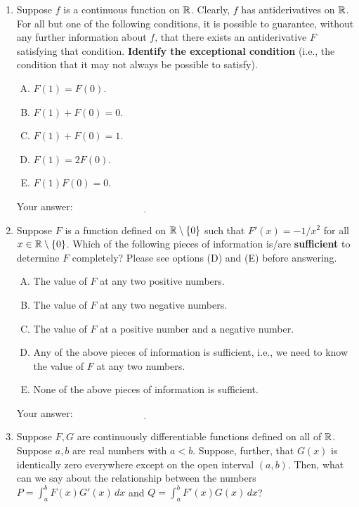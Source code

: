 \documentclass[10pt]{amsart}
\begin{document}
\begin{enumerate}
\item Suppose $f$ is a continuous function on $\mathbb{R}$. Clearly, $f$ has
  antiderivatives on $\mathbb{R}$. For all but one of the following
  conditions, it is possible to guarantee, without any further
  information about $f$, that there exists an antiderivative $F$
  satisfying that condition. {\bf Identify the exceptional condition}
  (i.e., the condition that it may not always be possible to satisfy).

  \begin{enumerate}[(A)]
  \item $F(1) = F(0)$.
  \item $F(1) + F(0) = 0$.
  \item $F(1) + F(0) = 1$.
  \item $F(1) = 2F(0)$.
  \item $F(1)F(0) = 0$.
  \end{enumerate}

  \vspace{0.05in}
  Your answer: $\underline{\qquad\qquad\qquad\qquad\qquad\qquad\qquad}$
  \vspace{0.05in}

\item Suppose $F$ is a function defined on $\mathbb{R} \setminus \{ 0 \}$ such
  that $F'(x) = -1/x^2$ for all $x \in \mathbb{R} \setminus \{ 0 \}$. Which of
  the following pieces of information is/are {\bf sufficient} to determine
  $F$ completely? Please see options (D) and (E) before answering.

  \begin{enumerate}[(A)]
  \item The value of $F$ at any two positive numbers.
  \item The value of $F$ at any two negative numbers.
  \item The value of $F$ at a positive number and a negative number.
  \item Any of the above pieces of information is sufficient, i.e., we
    need to know the value of $F$ at any two numbers.
  \item None of the above pieces of information is sufficient.
  \end{enumerate}

  \vspace{0.05in}
  Your answer: $\underline{\qquad\qquad\qquad\qquad\qquad\qquad\qquad}$
  \vspace{0.05in}

\item Suppose $F,G$ are continuously differentiable functions defined
  on all of $\mathbb{R}$. Suppose $a,b$ are real numbers with $a <
  b$. Suppose, further, that $G(x)$ is identically zero everywhere
  except on the open interval $(a,b)$. Then, what can we say about the
  relationship between the numbers $P = \int_a^b F(x)G'(x) \,dx$ and
  $Q = \int_a^b F'(x)G(x) \, dx$?


\end{enumerate}
\end{document}
